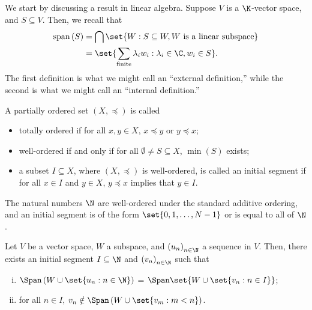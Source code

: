 \documentclass[10pt]{mypackage}
\begin{document}
We start by discussing a result in linear algebra. Suppose $V$ is a $\K$-vector space, and $S\subseteq V$. Then, we recall that
\begin{align*}
  \operatorname{span}\left( S \right) &= \bigcap\set{W : S\subseteq W,W\text{ is a linear subspace}}\\
                                      &= \set{\sum_{\text{finite}}\lambda_iw_i: \lambda_i\in \C, w_i\in S}.
\end{align*}
The first definition is what we might call an ``external definition,'' while the second is what we might call an ``internal definition.''
\begin{definition}
  A partially ordered set $\left( X,\preceq \right)$ is called
  \begin{itemize}
    \item totally ordered if for all $x,y\in X$, $x\preceq y$ or $y\preceq x$;
    \item well-ordered if and only if for all $\emptyset\neq S\subseteq X$, $\min\left( S \right)$ exists;
    \item a subset $I\subseteq X$, where $\left( X,\preceq \right)$ is well-ordered, is called an initial segment if for all $x\in I$ and $y\in X$, $y\preceq x$ implies that $y\in I$.
  \end{itemize}
\end{definition}
\begin{example}
  The natural numbers $\N$ are well-ordered under the standard additive ordering, and an initial segment is of the form $\set{0,1,\dots,N-1}$ or is equal to all of $\N$.
\end{example}
\begin{lemma}
  Let $V$ be a vector space, $W$ a subspace, and $\left( u_n \right)_{n\in \N}$ a sequence in $V$. Then, there exists an initial segment $I\subseteq \N$ and $\left( v_n \right)_{n\in \N}$ such that
  \begin{enumerate}[(i)]
    \item $\Span\left( W\cup \set{u_n : n\in \N} \right)$ = $\Span\set{W\cup \set{v_n : n\in I}}$;
    \item for all $n\in I$, $v_n\notin \Span\left( W\cup \set{v_m : m < n} \right)$.
  \end{enumerate}
\end{lemma}
\end{document}
